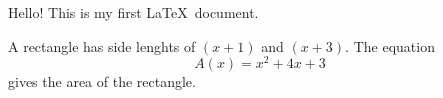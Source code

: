 \documentclass[11pt]{article}
\begin{document}
Hello! This is my first \LaTeX\ document.

A rectangle has side lenghts of $(x+1)$ and $(x+3)$.
The equation $${A(x)=x^2+4x+3}$$ gives the area of the rectangle.
\end{document}
